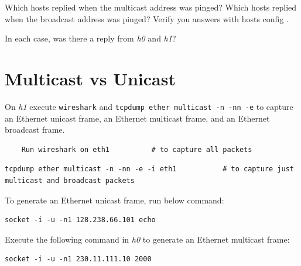 \documentclass{UTNetLab}
\begin{document}
    \begin{report}
        \item Which hosts replied when the multicast address was pinged?
            Which hosts replied when the broadcast address was pinged?
            Verify you answers with hosts config .

        \item In each case, was there a reply from \textit{h0} and \textit{h1}?
    \end{report}

\section{Multicast vs Unicast\label{sec:multicast-vs-unicast}}
    On \textit{h1} execute \lstinline{wireshark} and \lstinline{tcpdump ether multicast -n -nn -e} to capture an Ethernet unicast frame, an Ethernet multicast frame, and an Ethernet broadcast frame.

    \begin{lstlisting}
    Run wireshark on eth1          # to capture all packets
    \end{lstlisting}
 
 \begin{lstlisting}[emph={your-host, remote-host}]
 	tcpdump ether multicast -n -nn -e -i eth1			# to capture just multicast and broadcast packets
 \end{lstlisting}
 
To generate an Ethernet unicast frame, run below command:

\begin{lstlisting}[emph={your-host, remote-host}]
	socket -i -u -n1 128.238.66.101 echo
\end{lstlisting}

   Execute the following command in \textit{h0} to generate an Ethernet multicast frame:
   
    \begin{lstlisting}[emph={your-host, remote-host}]
	socket -i -u -n1 230.11.111.10 2000
    \end{lstlisting}
\end{document}
